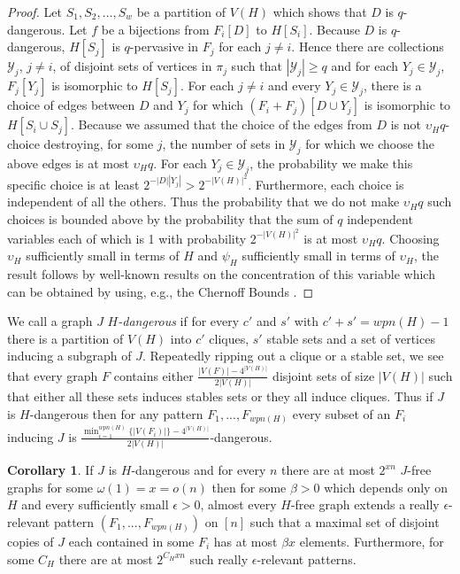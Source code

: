 \documentclass[12pt]{article}
\theoremstyle{definition}
\newtheorem{corollary}[theorem]{Corollary}
\newcommand\cY{{\mathcal Y}}
\begin{document}
\begin{proof}
Let $S_1,S_2,\ldots,S_w$ be a partition of $V(H)$ which shows that $D$ is $q$-dangerous. Let $f$ be a bijections from $F_i[D]$ to $H[S_i]$. Because $D$ is $q$-dangerous, $H[S_j]$ is $q$-pervasive in $F_j$ for each $j\neq i$. Hence there are collections $\cY_j$, $j\neq i$, of disjoint sets of vertices in $\pi_j$ such that $|\cY_j|\ge q$ and for each $Y_j\in \cY_j$, $F_j[Y_j]$ is isomorphic to $H[S_j]$. For each $j\neq i$ and every  $Y_j\in\cY_j$, there is a choice of edges between $D$ and $Y_j$ for which $(F_i+F_j)[D\cup Y_j]$ is isomorphic to $H[S_i\cup S_j]$. Because we assumed that  the choice of the edges from $D$ is not $\upsilon_H q$-choice destroying,  for some $j$, the number of sets in $\cY_j$ for which we choose the above edges is at most  $\upsilon_H q$. For each $Y_j\in \cY_j$,  the probability we make this specific choice is at least $2^{-|D||Y_j|}>2^{-|V(H)|^2}$. Furthermore, each choice is independent of all the others. Thus the probability that we do not make $\upsilon_H q$ such choices is bounded above by the probability that the sum of $q$ independent variables each of which is 1 with probability $2^{-|V(H)|^2}$ is at most $\upsilon_H q$. Choosing $\upsilon_H$ sufficiently small in terms of $H$ and $\psi_H$ sufficiently small in terms of $\upsilon_H$, the result follows by well-known results on the concentration of this variable which can be obtained by using, e.g., the Chernoff Bounds \cite{C81}. 
\end{proof}





We call a graph $J$  {\it $H$-dangerous} if for every $c'$ and $s'$ with $c'+s'=wpn(H)-1$ there is a partition of $V(H)$ into $c'$ cliques, $s'$ stable sets and a set of vertices inducing a subgraph of $J$. Repeatedly ripping out a clique or 
a stable set, we see that   every graph $F$  contains either $\frac{|V(F)|-4^{|V(H)|}}{2|V(H)|}$
disjoint  sets  of size $|V(H)|$ such that either all these sets induces stables sets or  they all induce cliques. 
Thus if $J$ is $H$-dangerous then for any   pattern $F_1,...,F_{wpn(H)}$ every  subset of an $F_i$ inducing  
$J$  is $\frac{\min_{i=1}^{wpn(H)}\{|V(F_i)|\}-4^{|V(H)|}}{2|V(H)|}$-dangerous.

\begin{corollary}\label{p4hit}
    If $J$ is $H$-dangerous and for every $n$ there are at most $2^{xn}$  $J$-free graphs for some $  \omega(1)=x=o(n)$ 
    then  for some $\beta>0$ which depends only on $H$ and every sufficiently small $\epsilon>0$,  almost every $H$-free graph extends a   really $\epsilon$-relevant pattern $(F_1,...,F_{wpn(H)})$ on $[n]$ such that a maximal set of disjoint copies of $J$ each contained in some $F_i$ has at most $\beta x$ elements. Furthermore, for some $C_H$ there are at most  $2^{C_Hxn}$ such really $\epsilon$-relevant patterns. 
\end{corollary}
\end{document}
